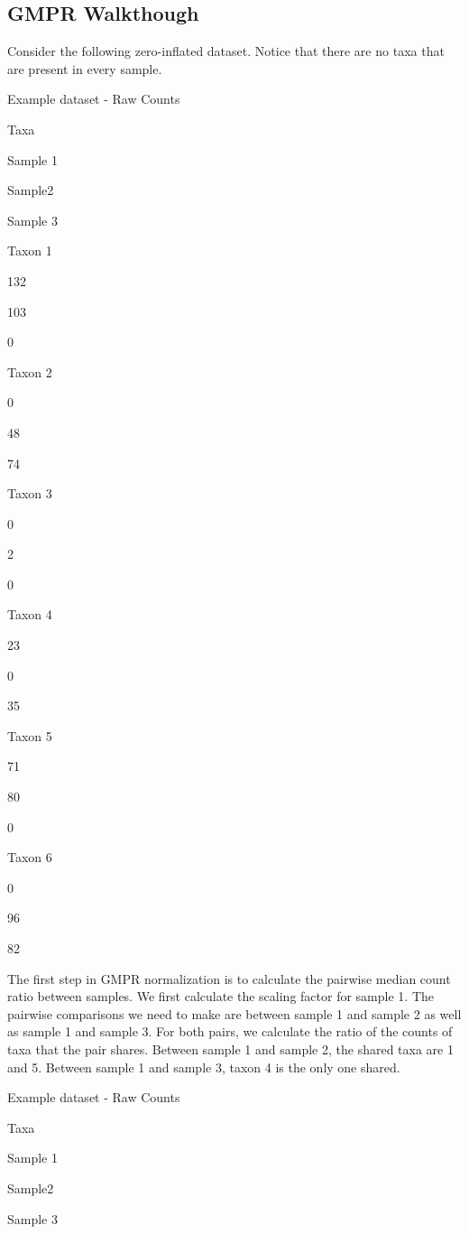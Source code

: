 \documentclass[
]{book}
\begin{document}
\hypertarget{gmpr-walkthough}{%
\subsection{GMPR Walkthough}\label{gmpr-walkthough}}

Consider the following zero-inflated dataset. Notice that there are no taxa that are present in every sample.

\label{tab:unnamed-chunk-29}Example dataset - Raw Counts

Taxa

Sample 1

Sample2

Sample 3

Taxon 1

132

103

0

Taxon 2

0

48

74

Taxon 3

0

2

0

Taxon 4

23

0

35

Taxon 5

71

80

0

Taxon 6

0

96

82

The first step in GMPR normalization is to calculate the pairwise median count ratio between samples. We first calculate the scaling factor for sample 1. The pairwise comparisons we need to make are between sample 1 and sample 2 as well as sample 1 and sample 3. For both pairs, we calculate the ratio of the counts of taxa that the pair shares. Between sample 1 and sample 2, the shared taxa are 1 and 5. Between sample 1 and sample 3, taxon 4 is the only one shared.

\label{tab:unnamed-chunk-30}Example dataset - Raw Counts

Taxa

Sample 1

Sample2

Sample 3
\end{document}
